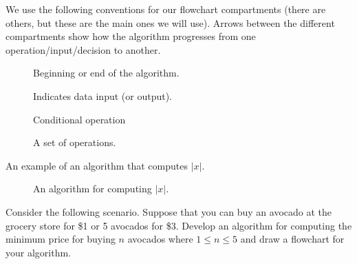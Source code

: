 \documentclass{ximera}
\begin{document}
We use the following conventions for our flowchart compartments (there are others, but these are the main ones we will use). Arrows between the different compartments show how the algorithm progresses from one operation/input/decision to another.

\begin{figure}[!ht]
	\centering
	\caption{Beginning or end of the algorithm.}
\end{figure}

\begin{figure}[!ht]
	\centering
	\caption{Indicates data input (or output).}
\end{figure}

\begin{figure}[!ht]
	\centering
	\caption{Conditional operation}
\end{figure}

\begin{figure}[!ht]
	\centering
	\caption{A set of operations.}
\end{figure}

An example of an algorithm that computes $|x|$.

\begin{figure}[!ht]
	\centering
	\caption{An algorithm for computing $|x|$.}
\end{figure}

Consider the following scenario. Suppose that you can buy an avocado at the grocery store for \$1 or 5 avocados for \$3. Develop an algorithm for computing the minimum price for buying $n$ avocados where $1\leq n\leq 5$ and draw a flowchart for your algorithm.
\end{document}

